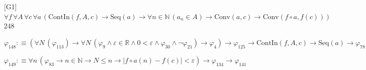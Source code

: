 \begin{fullproof}{[G1]}{$\forall f\,\forall A\,\forall c\,\forall a\,(\mathrm{ContIn}(f,A,c) \to \mathrm{Seq}(a) \to \forall n \in \mathbb{N}\,(a_{n} \in A) \to \mathrm{Conv}(a,c) \to \mathrm{Conv}(f \circ a,f(c)))$}{248}
\begin{abbrevlist}
\item $\varphi_{148} :\equiv (\forall N\,(\varphi_{113}) \to \forall N\,(\varphi_{9} \land \varepsilon \in \mathbb{R} \land 0 < \varepsilon \land \varphi_{30} \land \neg \varphi_{21}) \to \varphi_{4}) \to \varphi_{125} \to \mathrm{ContIn}(f,A,c) \to \mathrm{Seq}(a) \to \varphi_{78}$
\item $\varphi_{149} :\equiv \forall n\,(\varphi_{83} \to n \in \mathbb{N} \to N \leq n \to \lvert f \circ a(n) - f(c) \rvert < \varepsilon) \to \varphi_{134} \to \varphi_{141}$
\end{abbrevlist}
\end{fullproof}
